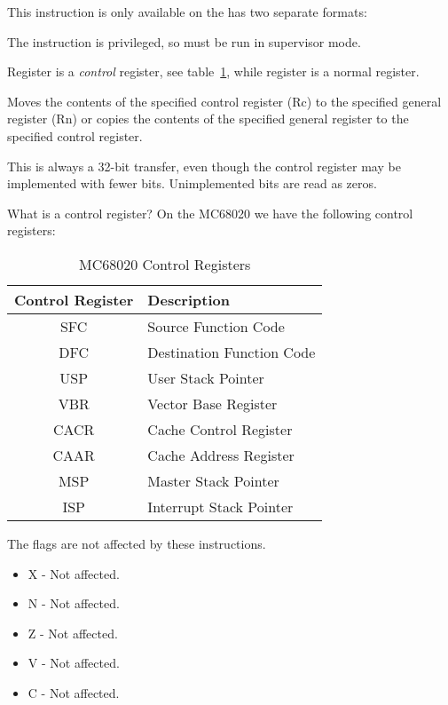 This instruction is only available on the has two separate formats:


The instruction is privileged, so must be run in supervisor mode.

Register  is a \emph{control} register, see table~\ref{tab-MCCR}, while register  is a normal register.

Moves the contents of the specified control register (Rc) to the specified general register (Rn) or copies the contents of the specified general register to the specified control register. 

This is always a 32-bit transfer, even though the control register may be implemented with fewer bits. Unimplemented bits are read as zeros.

What is a control register? On the MC68020 we have the following control registers:

\begin{table}[h]
	\centering
	\begin{tabular}{c|l}
		\textbf{Control Register} & \textbf{Description}\\
		\toprule
		SFC  & Source Function Code\\
		DFC  & Destination Function Code\\
		USP  & User Stack Pointer\\
		VBR  & Vector Base Register\\
		CACR & Cache Control Register\\
		CAAR & Cache Address Register\\
		MSP  & Master Stack Pointer\\
		ISP  & Interrupt Stack Pointer\\
	\end{tabular}
	\caption{MC68020 Control Registers}
	\label{tab-MCCR}
\end{table}

The flags are not affected by these instructions.

\begin{itemize}
    \item X - Not affected.
    \item N - Not affected.
    \item Z - Not affected.
    \item V - Not affected.
    \item C - Not affected.
\end{itemize}

